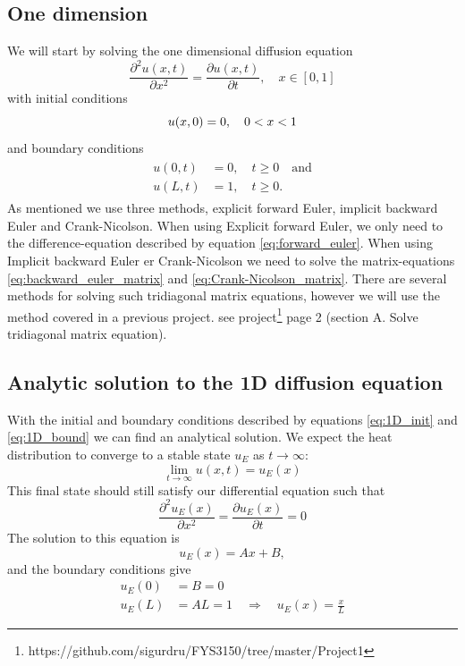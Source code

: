 \documentclass[reprint, english,notitlepage,nofootinbib]{revtex4-1}  %
\newcommand{\ddpart}[2]{\frac{\partial #1}{\partial #2}}
\begin{document}
\subsection{One dimension}
We will start by solving the one dimensional diffusion equation
\begin{equation*}
  \frac{\partial^2 u(x,t)}{\partial x^2} = \frac{\partial u(x,t)}{\partial t}, \quad x \in [0, 1]
\end{equation*}
with initial conditions
\begin{equation}
	\label{eq:1D_init}
  u(x, 0) = 0, \quad 0<x<1\\
\end{equation}
and boundary conditions
\begin{align}
	\label{eq:1D_bound}
	\begin{split}
  u(0, t) &= 0, \quad t \ge 0 \quad \text{and} \\
  u(L, t) &= 1, \quad t \ge 0.	
  \end{split}
\end{align}
As mentioned we use three methods, explicit forward Euler, implicit backward Euler and Crank-Nicolson. When using Explicit forward Euler, we only need to the difference-equation described by equation \eqref{eq:forward_euler}. When using Implicit backward Euler er Crank-Nicolson we need to solve the matrix-equations \eqref{eq:backward_euler_matrix} and \eqref{eq:Crank-Nicolson_matrix}. There are several methods for solving such tridiagonal matrix equations, however we will use the method covered in a previous project. see project\footnote{https://github.com/sigurdru/FYS3150/tree/master/Project1} page 2 (section A. Solve tridiagonal matrix equation).

\subsection*{Analytic solution to the 1D diffusion equation}

With the initial and boundary conditions described by equations \eqref{eq:1D_init} and \eqref{eq:1D_bound} we can find an analytical solution. We expect the heat distribution to converge to a stable state $u_E$ as $t \to \infty$:
\begin{equation*}
\lim_{t \to \infty} u(x, t) = u_E(x)
\end{equation*}
This final state should still satisfy our differential equation such that
\begin{equation*}
\frac{\partial^2 u_E(x)}{\partial x^2} = \ddpart{u_E(x)}{t} = 0
\end{equation*}
The solution to this equation is
\begin{equation*}
u_E(x) = A x + B,
\end{equation*}
and the boundary conditions give
\begin{align*}
u_E(0) &= B = 0 \\
u_E(L) &= A L = 1 \quad \Rightarrow \quad u_E(x) = \frac{x}{L}
\end{align*}
\end{document}
